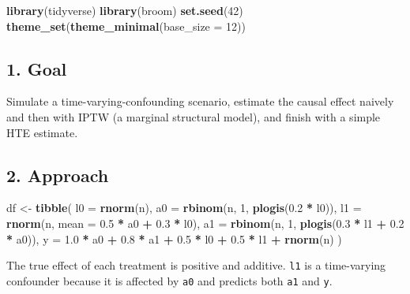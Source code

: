 \documentclass[
]{article}
\newenvironment{Shaded}{\begin{snugshade}}{\end{snugshade}}
\newcommand{\AttributeTok}[1]{\textcolor[rgb]{0.13,0.29,0.53}{#1}}
\newcommand{\DecValTok}[1]{\textcolor[rgb]{0.00,0.00,0.81}{#1}}
\newcommand{\FloatTok}[1]{\textcolor[rgb]{0.00,0.00,0.81}{#1}}
\newcommand{\FunctionTok}[1]{\textcolor[rgb]{0.13,0.29,0.53}{\textbf{#1}}}
\newcommand{\NormalTok}[1]{#1}
\newcommand{\OtherTok}[1]{\textcolor[rgb]{0.56,0.35,0.01}{#1}}
\newcommand{\SpecialCharTok}[1]{\textcolor[rgb]{0.81,0.36,0.00}{\textbf{#1}}}
\begin{document}
\begin{Shaded}
\begin{Highlighting}[]
\FunctionTok{library}\NormalTok{(tidyverse)}
\FunctionTok{library}\NormalTok{(broom)}
\FunctionTok{set.seed}\NormalTok{(}\DecValTok{42}\NormalTok{)}
\FunctionTok{theme\_set}\NormalTok{(}\FunctionTok{theme\_minimal}\NormalTok{(}\AttributeTok{base\_size =} \DecValTok{12}\NormalTok{))}
\end{Highlighting}
\end{Shaded}

\subsection{1. Goal}\label{goal}

Simulate a time-varying-confounding scenario, estimate the causal effect
naively and then with IPTW (a marginal structural model), and finish
with a simple HTE estimate.

\subsection{2. Approach}\label{approach}

\begin{Shaded}
\begin{Highlighting}[]
\NormalTok{df }\OtherTok{\textless{}{-}} \FunctionTok{tibble}\NormalTok{(}
  \AttributeTok{l0 =} \FunctionTok{rnorm}\NormalTok{(n),}
  \AttributeTok{a0 =} \FunctionTok{rbinom}\NormalTok{(n, }\DecValTok{1}\NormalTok{, }\FunctionTok{plogis}\NormalTok{(}\FloatTok{0.2} \SpecialCharTok{*}\NormalTok{ l0)),}
  \AttributeTok{l1 =} \FunctionTok{rnorm}\NormalTok{(n, }\AttributeTok{mean =} \FloatTok{0.5} \SpecialCharTok{*}\NormalTok{ a0 }\SpecialCharTok{+} \FloatTok{0.3} \SpecialCharTok{*}\NormalTok{ l0),}
  \AttributeTok{a1 =} \FunctionTok{rbinom}\NormalTok{(n, }\DecValTok{1}\NormalTok{, }\FunctionTok{plogis}\NormalTok{(}\FloatTok{0.3} \SpecialCharTok{*}\NormalTok{ l1 }\SpecialCharTok{+} \FloatTok{0.2} \SpecialCharTok{*}\NormalTok{ a0)),}
  \AttributeTok{y  =} \FloatTok{1.0} \SpecialCharTok{*}\NormalTok{ a0 }\SpecialCharTok{+} \FloatTok{0.8} \SpecialCharTok{*}\NormalTok{ a1 }\SpecialCharTok{+} \FloatTok{0.5} \SpecialCharTok{*}\NormalTok{ l0 }\SpecialCharTok{+} \FloatTok{0.5} \SpecialCharTok{*}\NormalTok{ l1 }\SpecialCharTok{+} \FunctionTok{rnorm}\NormalTok{(n)}
\NormalTok{)}
\end{Highlighting}
\end{Shaded}

The true effect of each treatment is positive and additive. \texttt{l1}
is a time-varying confounder because it is affected by \texttt{a0} and
predicts both \texttt{a1} and \texttt{y}.
\end{document}
